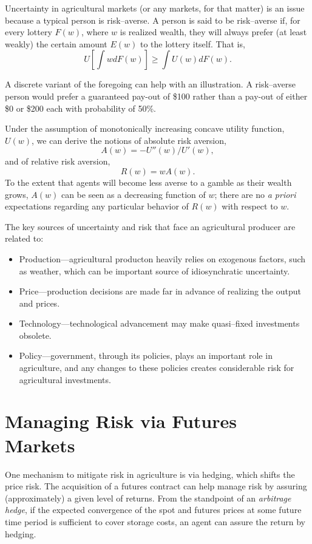 \documentclass[
]{book}
\providecommand{\tightlist}{%
  \setlength{\itemsep}{0pt}\setlength{\parskip}{0pt}}
\begin{document}
Uncertainty in agricultural markets (or any markets, for that matter) is an issue because a typical person is risk--averse. A person is said to be risk--averse if, for every lottery \(F(w)\), where \(w\) is realized wealth, they will always prefer (at least weakly) the certain amount \(E(w)\) to the lottery itself. That is, \[U\left[\int w dF(w)\right] \ge \int U(w)dF(w).\]

A discrete variant of the foregoing can help with an illustration. A risk--averse person would prefer a guaranteed pay-out of \$100 rather than a pay-out of either \$0 or \$200 each with probability of 50\%.

Under the assumption of monotonically increasing concave utility function, \(U(w)\), we can derive the notions of absolute risk aversion, \[A(w) = -U''(w)/U'(w),\] and of relative risk aversion, \[R(w) = wA(w).\] To the extent that agents will become less averse to a gamble as their wealth grows, \(A(w)\) can be seen as a decreasing function of \(w\); there are no \emph{a priori} expectations regarding any particular behavior of \(R(w)\) with respect to \(w\).

The key sources of uncertainty and risk that face an agricultural producer are related to:

\begin{itemize}
\tightlist
\item
  Production---agricultural producton heavily relies on exogenous factors, such as weather, which can be important source of idiosynchratic uncertainty.
\item
  Price---production decisions are made far in advance of realizing the output and prices.
\item
  Technology---technological advancement may make quasi--fixed investments obsolete.
\item
  Policy---government, through its policies, plays an important role in agriculture, and any changes to these policies creates considerable risk for agricultural investments.
\end{itemize}

\hypertarget{managing-risk-via-futures-markets}{%
\section{Managing Risk via Futures Markets}\label{managing-risk-via-futures-markets}}

One mechanism to mitigate risk in agriculture is via hedging, which shifts the price risk. The acquisition of a futures contract can help manage risk by assuring (approximately) a given level of returns. From the standpoint of an \emph{arbitrage hedge}, if the expected convergence of the spot and futures prices at some future time period is sufficient to cover storage costs, an agent can assure the return by hedging.
\end{document}
